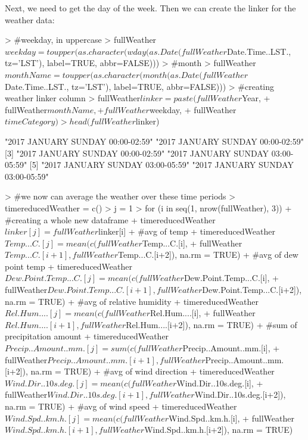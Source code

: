 \documentclass[11pt, a4paper]{article}
\begin{document}
Next, we need to get the day of the week. Then we can create the linker for the weather data:

\begin{Schunk}
\begin{Sinput}
> #weekday, in uppercase
> fullWeather$weekday = toupper(as.character(wday(as.Date(fullWeather$Date.Time..LST., tz='LST'), label=TRUE, abbr=FALSE)))
> #month
> fullWeather$monthName = toupper(as.character(month(as.Date(fullWeather$Date.Time..LST., tz='LST'), label=TRUE, abbr=FALSE)))
> #creating weather linker column
> fullWeather$linker = paste(fullWeather$Year,
+                          fullWeather$monthName,
+                          fullWeather$weekday,
+                          fullWeather$timeCategory)
> head(fullWeather$linker)
\end{Sinput}
\begin{Soutput}
[1] "2017 JANUARY SUNDAY 00:00-02:59" "2017 JANUARY SUNDAY 00:00-02:59"
[3] "2017 JANUARY SUNDAY 00:00-02:59" "2017 JANUARY SUNDAY 03:00-05:59"
[5] "2017 JANUARY SUNDAY 03:00-05:59" "2017 JANUARY SUNDAY 03:00-05:59"
\end{Soutput}
\begin{Sinput}
> #we now can average the weather over these time periods
> timereducedWeather = c()
> j = 1
> for (i in seq(1, nrow(fullWeather), 3)){
+   #creating a whole new dataframe
+   timereducedWeather$linker[j] = fullWeather$linker[i]
+   #avg of temp
+   timereducedWeather$Temp...C.[j] = mean(c(fullWeather$Temp...C.[i],
+     fullWeather$Temp...C.[i+1], fullWeather$Temp...C.[i+2]), na.rm = TRUE)
+   #avg of dew point temp
+   timereducedWeather$Dew.Point.Temp...C.[j] = mean(c(fullWeather$Dew.Point.Temp...C.[i],
+     fullWeather$Dew.Point.Temp...C.[i+1], fullWeather$Dew.Point.Temp...C.[i+2]), na.rm = TRUE)
+   #avg of relative humidity
+   timereducedWeather$Rel.Hum....[j] = mean(c(fullWeather$Rel.Hum....[i],
+     fullWeather$Rel.Hum....[i+1], fullWeather$Rel.Hum....[i+2]), na.rm = TRUE)
+   #sum of precipitation amount
+   timereducedWeather$Precip..Amount..mm.[j] = sum(c(fullWeather$Precip..Amount..mm.[i],
+     fullWeather$Precip..Amount..mm.[i+1], fullWeather$Precip..Amount..mm.[i+2]), na.rm = TRUE)
+   #avg of wind direction
+   timereducedWeather$Wind.Dir..10s.deg.[j] = mean(c(fullWeather$Wind.Dir..10s.deg.[i],
+     fullWeather$Wind.Dir..10s.deg.[i+1], fullWeather$Wind.Dir..10s.deg.[i+2]), na.rm = TRUE)
+   #avg of wind speed
+   timereducedWeather$Wind.Spd..km.h.[j] = mean(c(fullWeather$Wind.Spd..km.h.[i], 
+     fullWeather$Wind.Spd..km.h.[i+1],  fullWeather$Wind.Spd..km.h.[i+2]), na.rm = TRUE)
}
\end{Sinput}
\end{Schunk}
\end{document}
